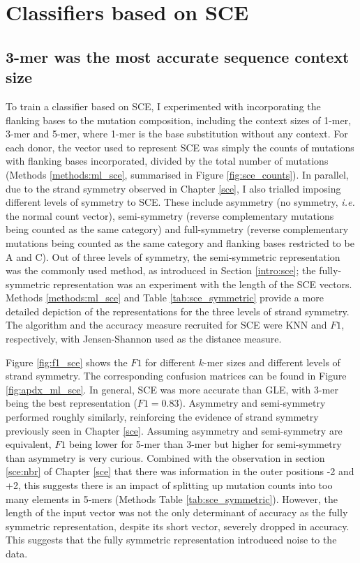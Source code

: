 

\section{Classifiers based on SCE}\label{ml:sce}

\subsection{3-mer was the most accurate sequence context size}
To train a classifier based on SCE, I experimented with incorporating the flanking bases to the mutation composition, including the context sizes of 1-mer, 3-mer and 5-mer, where 1-mer is the base substitution without any context. For each donor, the vector used to represent SCE was simply the counts of mutations with flanking bases incorporated, divided by the total number of mutations (Methods \ref{methods:ml_sce}, summarised in Figure \ref{fig:sce_counts}). In parallel, due to the strand symmetry observed in Chapter \ref{sce}, I also trialled imposing different levels of symmetry to SCE. These include asymmetry (no symmetry, \textit{i.e.} the normal count vector), semi-symmetry (reverse complementary mutations being counted as the same category) and full-symmetry (reverse complementary mutations being counted as the same category and flanking bases restricted to be A and C). Out of three levels of symmetry, the semi-symmetric representation was the commonly used method, as introduced in Section \ref{intro:sce}; the fully-symmetric representation was an experiment with the length of the SCE vectors. Methods \ref{methods:ml_sce} and Table \ref{tab:sce_symmetric} provide a more detailed depiction of the representations for the three levels of strand symmetry. The algorithm and the accuracy measure recruited for SCE were KNN and $F1$, respectively, with Jensen-Shannon used as the distance measure. 

Figure \ref{fig:f1_sce} shows the $F1$ for different $k$-mer sizes and different levels of strand symmetry. The corresponding confusion matrices can be found in Figure \ref{fig:apdx_ml_sce}. In general, SCE was more accurate than GLE, with 3-mer being the best representation ($F1=0.83$). Asymmetry and semi-symmetry performed roughly similarly, reinforcing the evidence of strand symmetry previously seen in Chapter \ref{sce}. Assuming asymmetry and semi-symmetry are equivalent, $F1$ being lower for 5-mer than 3-mer but higher for semi-symmetry than asymmetry is very curious. Combined with the observation in section \ref{sce:nbr} of Chapter \ref{sce} that there was information in the outer positions -2 and +2, this suggests there is an impact of splitting up mutation counts into too many elements in 5-mers (Methods Table \ref{tab:sce_symmetric}). However, the length of the input vector was not the only determinant of accuracy as the fully symmetric representation, despite its short vector, severely dropped in accuracy. This suggests that the fully symmetric representation introduced noise to the data.

